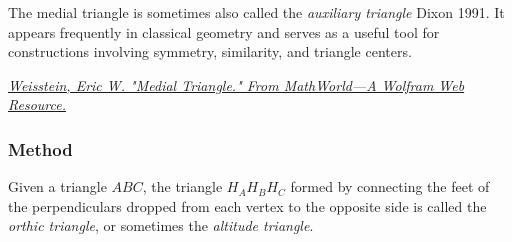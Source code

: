 The medial triangle is sometimes also called the \emph{auxiliary triangle} Dixon 1991. It appears frequently in classical geometry and serves as a useful tool for constructions involving symmetry, similarity, and triangle centers.
\begin{flushright}
  \small
\href{https://mathworld.wolfram.com/MedialTriangle.html}
{\textit{Weisstein, Eric W. "Medial Triangle." From MathWorld—A Wolfram Web Resource.}}
\end{flushright}

\vspace{1em}

\vspace{1em}
\begin{minipage}{.5\textwidth}
\begin{center}
  \end{center}
\end{minipage}
\begin{minipage}{.5\textwidth}
\begin{tkzexample}
\end{tkzexample}
\end{minipage}

\subsubsection{Method }
\label{ssub:method_triangle_orthic}

Given a triangle $ABC$, the triangle $H_AH_BH_C$ formed by connecting the feet of the perpendiculars dropped from each vertex to the opposite side is called the \emph{orthic triangle}, or sometimes the \emph{altitude triangle}.

